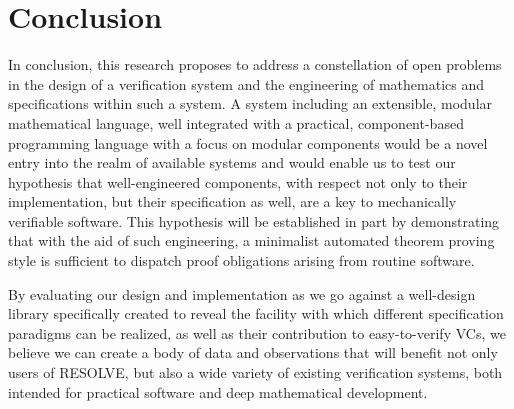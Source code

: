 \chapter{Conclusion}\label{sec:conclusion}
In conclusion, this research proposes to address a constellation of open problems in the design of a verification system and the engineering of mathematics and specifications within such a system.  A system including an extensible, modular mathematical language, well integrated with a practical, component-based programming language with a focus on modular components would be a novel entry into the realm of available systems and would enable us to test our hypothesis that well-engineered components, with respect not only to their implementation, but their specification as well, are a key to mechanically verifiable software.  This hypothesis will be established in part by demonstrating that with the aid of such engineering, a minimalist automated theorem proving style is sufficient to dispatch proof obligations arising from routine software.

By evaluating our design and implementation as we go against a well-design library specifically created to reveal the facility with which different specification paradigms can be realized, as well as their contribution to easy-to-verify VCs, we believe we can create a body of data and observations that will benefit not only users of RESOLVE, but also a wide variety of existing verification systems, both intended for practical software and deep mathematical development.
